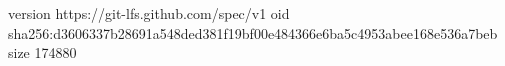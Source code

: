 version https://git-lfs.github.com/spec/v1
oid sha256:d3606337b28691a548ded381f19bf00e484366e6ba5c4953abee168e536a7beb
size 174880
